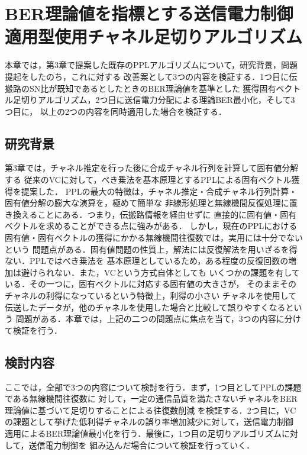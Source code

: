 \chapter{BER理論値を指標とする送信電力制御適用型使用チャネル足切りアルゴリズム
}
本章では，第3章で提案した既存のPPLアルゴリズムについて，研究背景，問題提起をしたのち，これに対する
改善案として3つの内容を検証する．1つ目に伝搬路のSN比が既知であるとしたときのBER理論値を基準とした
獲得固有ベクトル足切りアルゴリズム，2つ目に送信電力分配による理論BER最小化，そして3つ目に，
以上の2つの内容を同時適用した場合を検証する．

\section{研究背景}
第3章では，チャネル推定を行った後に合成チャネル行列を計算して固有値分解する
従来のVCに対して，べき乗法を基本原理とするPPLによる固有ベクトル獲得を提案した．
PPLの最大の特徴は，チャネル推定・合成チャネル行列計算・固有値分解の膨大な演算を，極めて簡単な
非線形処理と無線機間反復処理に置き換えることにある．つまり，伝搬路情報を経由せずに
直接的に固有値・固有ベクトルを求めることができる点に強みがある．
しかし，現在のPPLにおける固有値・固有ベクトルの獲得にかかる無線機間往復数では，実用には十分でないという
問題点がある．固有値問題の性質上，解法には反復解法を用いざるを得ない．PPLではべき乗法を
基本原理としているため，ある程度の反復回数の増加は避けられない．また，VCという方式自体としても
いくつかの課題を有している．その一つに，固有ベクトルに対応する固有値の大きさが，
そのままそのチャネルの利得になっているという特徴上，利得の小さい
チャネルを使用して伝送したデータが，他のチャネルを使用した場合と比較して誤りやすくなるという
問題がある．本章では，上記の二つの問題点に焦点を当て，3つの内容に分けて検証を行う．

\section{検討内容}
ここでは，全部で3つの内容について検討を行う．まず，1つ目としてPPLの課題である無線機間往復数に
対して，一定の通信品質を満たさないチャネルをBER理論値に基づいて足切りすることによる往復数削減
を検証する．2つ目に，VCの課題として挙げた低利得チャネルの誤り率増加減少に対して，送信電力制御
適用によるBER理論値最小化を行う．最後に，1つ目の足切りアルゴリズムに対して，送信電力制御を
組み込んだ場合について検証を行っていく．

